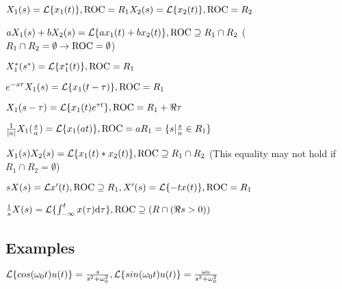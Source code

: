 $X_1(s)=\mathcal L\{ x_1(t)\},\text{ROC}=R_1 \\ X_2(s)=\mathcal L\{ x_2(t)\},\text{ROC}=R_2$

$aX_1(s) + bX_2(s) = \mathcal L\{ax_1(t) + bx_2(t)\}, \text{ROC}\supseteq R_1\cap R_2 $ 
($R_1\cap R_2=\emptyset\to \text{ROC}=\emptyset$)

$X_1^*(s^*)=\mathcal L\{x_1^*(t)\}, \text{ROC}=R_1$

$e^{-s\tau}X_1(s)=\mathcal L\{x_1(t-\tau)\}, \text{ROC}=R_1$

$X_1(s-\tau)=\mathcal L\{x_1(t)e^{\tau t}\}, \text{ROC}=R_1+\Re{\tau}$

$\frac{1}{|a|}X_1(\frac s a)=\mathcal L\{x_1(at)\}, \text{ROC}=aR_1=\{s|\frac s a \in R_1\}$

$X_1(s)X_2(s)=\mathcal L\{x_1(t) * x_2(t) \}, \text{ROC} \supseteq R_1\cap R_2$ (This equality may not hold if $R_1\cap R_2=\emptyset$)

$sX(s)=\mathcal L{x'(t)}, \text{ROC} \supseteq R_1, X'(s)=\mathcal L\{-tx(t)\}, \text{ROC} = R_1$

$\frac 1 sX(s)=\mathcal L\{\int_{-\infty}^t x(\tau)\mathrm{d} \tau\}, \text{ROC} \supseteq (R\cap (\Re s>0))$

\subsection*{Examples}

$\mathcal L\{cos(\omega_0 t) u(t)\} = \frac{s}{s^2+\omega_0^2}, \mathcal L\{sin(\omega_0 t) u(t)\} = \frac{\omega_0}{s^2+\omega_0^2}$
